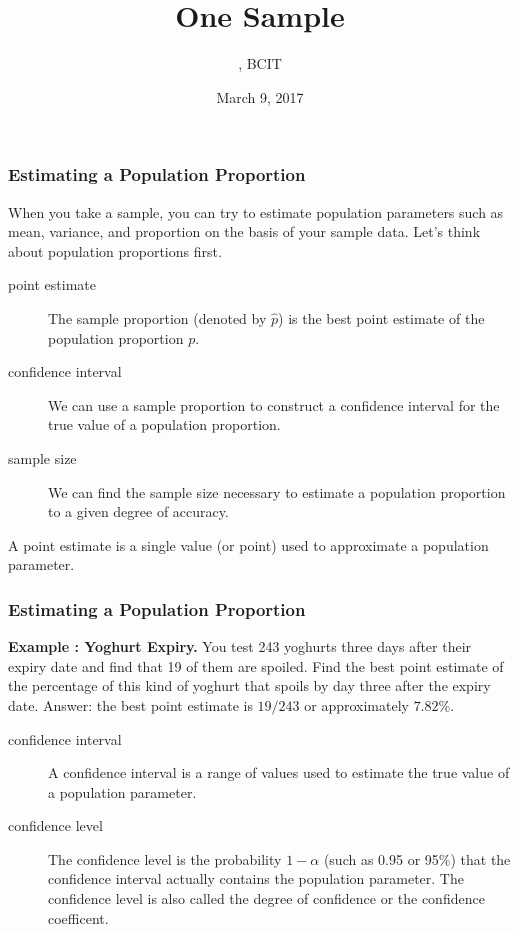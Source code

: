 \documentclass[xcolor=dvipsnames]{beamer}
\title{One Sample}
\subtitle{{\CourseNumber}, BCIT}
\author{\CourseName}
\date{March 9, 2017}
\newcounter{expls}
\newcommand{\beispiel}[1]{\refstepcounter{expls}\textbf{Example \arabic{expls}: #1.}}
\begin{document}
\begin{frame}
  \titlepage
\end{frame}

\begin{frame}
  \frametitle{Estimating a Population Proportion}
When you take a sample, you can try to estimate population parameters
such as mean, variance, and proportion on the basis of your sample
data. Let's think about population proportions first.
\begin{description}
\item[point estimate] The sample proportion (denoted by $\hat{p}$) is
  the best point estimate of the population proportion $p$.
\item[confidence interval] We can use a sample proportion to construct
  a confidence interval for the true value of a population proportion.
\item[sample size] We can find the sample size necessary to estimate a
  population proportion to a given degree of accuracy.
\end{description}
A \alert{point estimate} is a single value (or point) used to
approximate a population parameter.
\end{frame}

\begin{frame}
  \frametitle{Estimating a Population Proportion}
\beispiel{Yoghurt Expiry} You test 243 yoghurts three days after their
expiry date and find that 19 of them are spoiled. Find the best point
estimate of the percentage of this kind of yoghurt that spoils by day
three after the expiry date. Answer: the best point estimate is
$19/243$ or approximately $7.82$\%.

\bigskip

\begin{description}
\item[confidence interval] A confidence interval is a range of values
  used to estimate the true value of a population parameter. 
\item[confidence level] The confidence level is the probability
  $1-\alpha$ (such as 0.95 or 95\%) that the confidence interval
  actually contains the population parameter. The confidence level is
  also called the degree of confidence or the confidence coefficent.
\end{description}
\end{frame}
\end{document}
